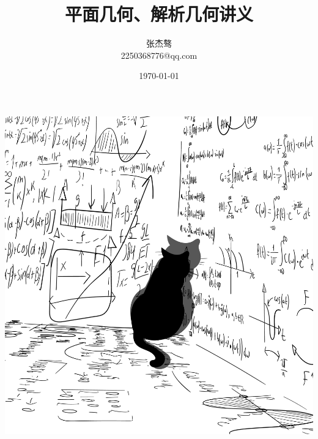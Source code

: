 \documentclass[a4paper]{ctexart}
\title{\bf{平面几何、解析几何讲义}}
\author{张杰骜\\2250368776@qq.com}
\date{\today}
\begin{document}
\maketitle%
\begin{center}%
    \includegraphics[scale=0.2]{0}
\end{center}%
\newpage
\tableofcontents%
\newpage
\raggedbottom%


\newpage

\newpage

\newpage

\newpage

\newpage

\newpage

\newpage

\newpage

\end{document}
